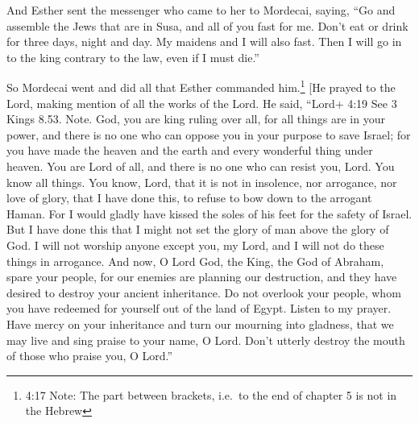  And Esther sent the messenger who came to her to Mordecai,
saying,  ``Go and assemble the Jews that are in Susa, and
all of you fast for me. Don't eat or drink for three days, night and
day. My maidens and I will also fast. Then I will go in to the king
contrary to the law, even if I must die.''

 So Mordecai went and did all that Esther commanded
him.\footnote{4:17 Note: The part between brackets, i.e.~to the end of
  chapter 5 is not in the Hebrew}  {[}He prayed to the
Lord, making mention of all the works of the Lord.  He
said, ``Lord+ 4:19 See 3 Kings 8.53. Note. God, you are king ruling over
all, for all things are in your power, and there is no one who can
oppose you in your purpose to save Israel;  for you have
made the heaven and the earth and every wonderful thing under heaven.
 You are Lord of all, and there is no one who can resist
you, Lord.  You know all things. You know, Lord, that it is
not in insolence, nor arrogance, nor love of glory, that I have done
this, to refuse to bow down to the arrogant Haman.  For I
would gladly have kissed the soles of his feet for the safety of Israel.
 But I have done this that I might not set the glory of man
above the glory of God. I will not worship anyone except you, my Lord,
and I will not do these things in arrogance.  And now, O
Lord God, the King, the God of Abraham, spare your people, for our
enemies are planning our destruction, and they have desired to destroy
your ancient inheritance.  Do not overlook your people,
whom you have redeemed for yourself out of the land of Egypt.
 Listen to my prayer. Have mercy on your inheritance and
turn our mourning into gladness, that we may live and sing praise to
your name, O Lord. Don't utterly destroy the mouth of those who praise
you, O Lord.''

